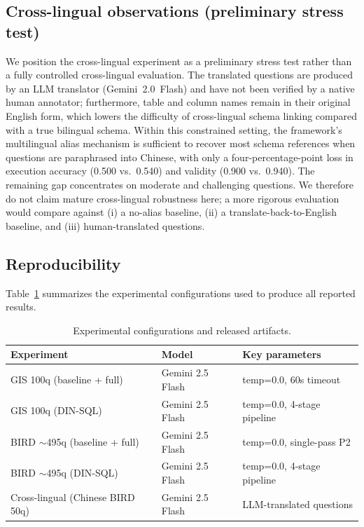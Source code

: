 \documentclass[11pt]{article}
\begin{document}
\subsection{Cross-lingual observations (preliminary stress test)}
\label{sec:cross-lingual}

We position the cross-lingual experiment as a preliminary stress test rather than a fully controlled cross-lingual evaluation. The translated questions are produced by an LLM translator (Gemini~2.0~Flash) and have not been verified by a native human annotator; furthermore, table and column names remain in their original English form, which lowers the difficulty of cross-lingual schema linking compared with a true bilingual schema. Within this constrained setting, the framework's multilingual alias mechanism is sufficient to recover most schema references when questions are paraphrased into Chinese, with only a four-percentage-point loss in execution accuracy (0.500 vs.\ 0.540) and validity (0.900 vs.\ 0.940). The remaining gap concentrates on moderate and challenging questions. We therefore do not claim mature cross-lingual robustness here; a more rigorous evaluation would compare against (i) a no-alias baseline, (ii) a translate-back-to-English baseline, and (iii) human-translated questions.

\subsection{Reproducibility}

Table~\ref{tab:repro} summarizes the experimental configurations used to produce all reported results.

\begin{table}[t]
\centering
\caption{Experimental configurations and released artifacts.}
\label{tab:repro}
\begin{tabular}{lll}
\toprule
Experiment & Model & Key parameters \\
\midrule
GIS 100q (baseline + full) & Gemini 2.5 Flash & temp=0.0, 60s timeout \\
GIS 100q (DIN-SQL) & Gemini 2.5 Flash & temp=0.0, 4-stage pipeline \\
BIRD $\sim$495q (baseline + full) & Gemini 2.5 Flash & temp=0.0, single-pass P2 \\
BIRD $\sim$495q (DIN-SQL) & Gemini 2.5 Flash & temp=0.0, 4-stage pipeline \\
Cross-lingual (Chinese BIRD 50q) & Gemini 2.5 Flash & LLM-translated questions \\
\bottomrule
\end{tabular}
\end{table}
\end{document}

